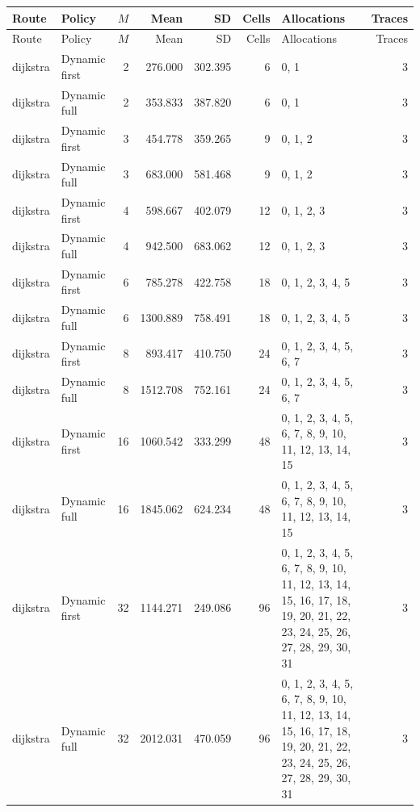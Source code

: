 \documentclass[10pt,a4paper]{article}
\begin{document}
\tiny\setlength{\tabcolsep}{2pt}\begin{longtable}{@{}p{23mm}p{29mm}rrrrp{36mm}r@{}}
\toprule Route & Policy & $M$ & Mean & SD & Cells & Allocations & Traces \\ \midrule\endfirsthead
\toprule Route & Policy & $M$ & Mean & SD & Cells & Allocations & Traces \\ \midrule\endhead
\bottomrule\endfoot
dijkstra & Dynamic first & 2 & 276.000 & 302.395 & 6 & 0, 1 & 3 \\
dijkstra & Dynamic full & 2 & 353.833 & 387.820 & 6 & 0, 1 & 3 \\
dijkstra & Dynamic first & 3 & 454.778 & 359.265 & 9 & 0, 1, 2 & 3 \\
dijkstra & Dynamic full & 3 & 683.000 & 581.468 & 9 & 0, 1, 2 & 3 \\
dijkstra & Dynamic first & 4 & 598.667 & 402.079 & 12 & 0, 1, 2, 3 & 3 \\
dijkstra & Dynamic full & 4 & 942.500 & 683.062 & 12 & 0, 1, 2, 3 & 3 \\
dijkstra & Dynamic first & 6 & 785.278 & 422.758 & 18 & 0, 1, 2, 3, 4, 5 & 3 \\
dijkstra & Dynamic full & 6 & 1300.889 & 758.491 & 18 & 0, 1, 2, 3, 4, 5 & 3 \\
dijkstra & Dynamic first & 8 & 893.417 & 410.750 & 24 & 0, 1, 2, 3, 4, 5, 6, 7 & 3 \\
dijkstra & Dynamic full & 8 & 1512.708 & 752.161 & 24 & 0, 1, 2, 3, 4, 5, 6, 7 & 3 \\
dijkstra & Dynamic first & 16 & 1060.542 & 333.299 & 48 & 0, 1, 2, 3, 4, 5, 6, 7, 8, 9, 10, 11, 12, 13, 14, 15 & 3 \\
dijkstra & Dynamic full & 16 & 1845.062 & 624.234 & 48 & 0, 1, 2, 3, 4, 5, 6, 7, 8, 9, 10, 11, 12, 13, 14, 15 & 3 \\
dijkstra & Dynamic first & 32 & 1144.271 & 249.086 & 96 & 0, 1, 2, 3, 4, 5, 6, 7, 8, 9, 10, 11, 12, 13, 14, 15, 16, 17, 18, 19, 20, 21, 22, 23, 24, 25, 26, 27, 28, 29, 30, 31 & 3 \\
dijkstra & Dynamic full & 32 & 2012.031 & 470.059 & 96 & 0, 1, 2, 3, 4, 5, 6, 7, 8, 9, 10, 11, 12, 13, 14, 15, 16, 17, 18, 19, 20, 21, 22, 23, 24, 25, 26, 27, 28, 29, 30, 31 & 3 \\
\end{longtable}\normalsize\setlength{\tabcolsep}{6pt}
\clearpage
\end{document}

